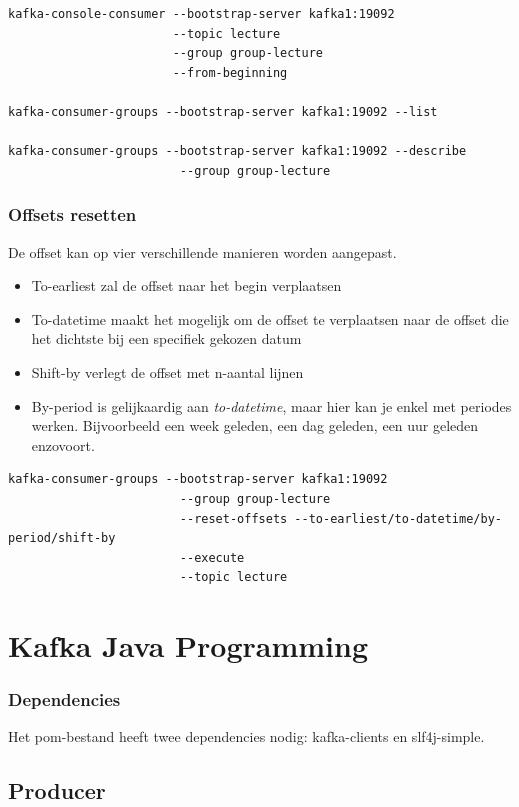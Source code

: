 \documentclass[a4paper,10pt,twoside]{report}
\begin{document}
\begin{lstlisting}[language=CLI-kafka]
kafka-console-consumer --bootstrap-server kafka1:19092
					   --topic lecture
					   --group group-lecture
					   --from-beginning
					   
kafka-consumer-groups --bootstrap-server kafka1:19092 --list

kafka-consumer-groups --bootstrap-server kafka1:19092 --describe
						--group group-lecture
\end{lstlisting}

\subsubsection{Offsets resetten}

De offset kan op vier verschillende manieren worden aangepast.

\begin{itemize}
	\item To-earliest zal de offset naar het begin verplaatsen
	\item To-datetime maakt het mogelijk om de offset te verplaatsen naar de offset die het dichtste bij een specifiek gekozen datum 
	\item Shift-by verlegt de offset met n-aantal lijnen
	\item By-period is gelijkaardig aan \textit{to-datetime}, maar hier kan je enkel met periodes werken. Bijvoorbeeld een week geleden, een dag geleden, een uur geleden enzovoort.
\end{itemize}

\begin{lstlisting}[language=CLI-kafka]
kafka-consumer-groups --bootstrap-server kafka1:19092
						--group group-lecture
						--reset-offsets --to-earliest/to-datetime/by-period/shift-by
						--execute
						--topic lecture
\end{lstlisting}

\section{Kafka Java Programming}

\subsubsection{Dependencies}

Het pom-bestand heeft twee dependencies nodig: kafka-clients en slf4j-simple.

\subsection{Producer}
\end{document}
